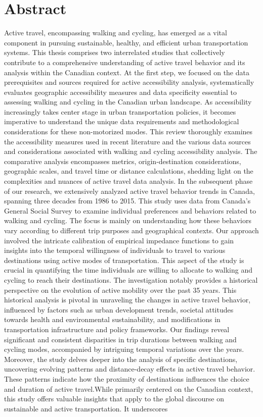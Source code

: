 \documentclass[
11pt, %
oneside, %
english, %
singlespacing, %
]{macthesis} %
\begin{document}
\section*{\Huge Abstract}
\addchaptertocentry{\abstractname}
Active travel, encompassing walking and cycling, has emerged as a vital component in pursuing sustainable, healthy, and efficient urban transportation systems. This thesis comprises two interrelated studies that collectively contribute to a comprehensive understanding of active travel behavior and its analysis within the Canadian context. At the first step, we focused on the data prerequisites and sources required for active accessibility analysis, systematically evaluates geographic accessibility measures and data specificity essential to assessing walking and cycling in the Canadian urban landscape. As accessibility increasingly takes center stage in urban transportation policies, it becomes imperative to understand the unique data requirements and methodological considerations for these non-motorized modes. This review thoroughly examines the accessibility measures used in recent literature and the various data sources and considerations associated with walking and cycling accessibility analysis. The comparative analysis encompasses metrics, origin-destination considerations, geographic scales, and travel time or distance calculations, shedding light on the complexities and nuances of active travel data analysis. In the subsequent phase of our research, we extensively analyzed active travel behavior trends in Canada, spanning three decades from 1986 to 2015. This study uses data from Canada's General Social Survey to examine individual preferences and behaviors related to walking and cycling. The focus is mainly on understanding how these behaviors vary according to different trip purposes and geographical contexts. Our approach involved the intricate calibration of empirical impedance functions to gain insights into the temporal willingness of individuals to travel to various destinations using active modes of transportation. This aspect of the study is crucial in quantifying the time individuals are willing to allocate to walking and cycling to reach their destinations. The investigation notably provides a historical perspective on the evolution of active mobility over the past 35 years. This historical analysis is pivotal in unraveling the changes in active travel behavior, influenced by factors such as urban development trends, societal attitudes towards health and environmental sustainability, and modifications in transportation infrastructure and policy frameworks. Our findings reveal significant and consistent disparities in trip durations between walking and cycling modes, accompanied by intriguing temporal variations over the years. Moreover, the study delves deeper into the analysis of specific destinations, uncovering evolving patterns and distance-decay effects in active travel behavior. These patterns indicate how the proximity of destinations influences the choice and duration of active travel.While primarily centered on the Canadian context, this study offers valuable insights that apply to the global discourse on sustainable and active transportation. It underscores 
\end{document}
